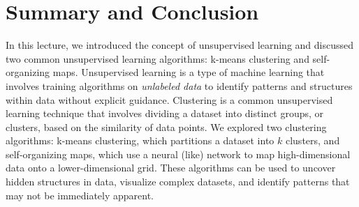 \documentclass{article}[11pt]
\begin{document}
\section{Summary and Conclusion}
In this lecture, we introduced the concept of unsupervised learning and discussed two common unsupervised learning algorithms: k-means clustering and self-organizing maps.
Unsupervised learning is a type of machine learning that involves training algorithms on \textit{unlabeled data} to identify patterns and structures within data without explicit guidance.
Clustering is a common unsupervised learning technique that involves dividing a dataset into distinct groups, or clusters, based on the similarity of data points.
We explored two clustering algorithms: k-means clustering, which partitions a dataset into $k$ clusters, and self-organizing maps, which use a neural (like) network to map high-dimensional data onto a lower-dimensional grid.
These algorithms can be used to uncover hidden structures in data, visualize complex datasets, and identify patterns that may not be immediately apparent.


\end{document}
